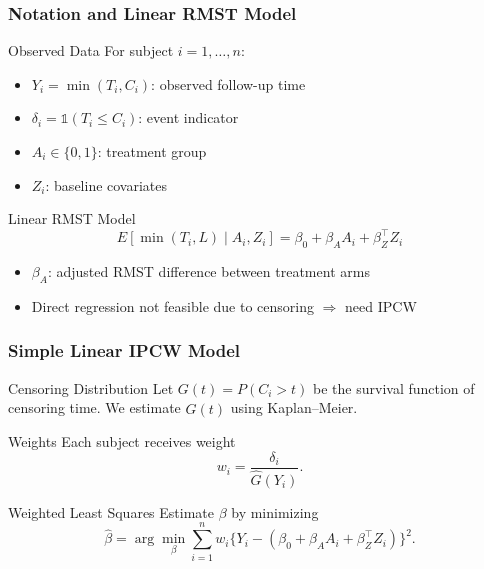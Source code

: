 \documentclass{beamer}
\begin{document}
\begin{frame}
\frametitle{Notation and Linear RMST Model}

\begin{block}{Observed Data}
For subject $i=1,\dots,n$:  
\begin{itemize}
  \item $Y_i = \min(T_i, C_i)$: observed follow-up time  
  \item $\delta_i = \mathbb{1}(T_i \le C_i)$: event indicator  
  \item $A_i \in \{0,1\}$: treatment group  
  \item $Z_i$: baseline covariates
\end{itemize}
\end{block}

\begin{block}{Linear RMST Model}
\[
E[\min(T_i,L) \mid A_i, Z_i] = \beta_0 + \beta_A A_i + \beta_Z^\top Z_i
\]

\begin{itemize}
  \item $\beta_A$: adjusted RMST difference between treatment arms  
  \item Direct regression not feasible due to censoring $\Rightarrow$ need IPCW
\end{itemize}
\end{block}

\end{frame}

\begin{frame}
\frametitle{Simple Linear IPCW Model \citep{zhao2001}}

\begin{block}{Censoring Distribution}
Let $G(t) = P(C_i > t)$ be the survival function of censoring time.  
We estimate $\widehat{G}(t)$ using Kaplan–Meier.
\end{block}

\begin{block}{Weights}
Each subject receives weight
\[
w_i = \frac{\delta_i}{\widehat{G}(Y_i)}.
\]
\end{block}

\begin{block}{Weighted Least Squares}
Estimate $\beta$ by minimizing
\[
\widehat{\beta} = \arg\min_\beta \sum_{i=1}^n w_i \Big\{ Y_i - (\beta_0 + \beta_A A_i + \beta_Z^\top Z_i)\Big\}^2.
\]
\end{block}

\end{frame}
\end{document}
